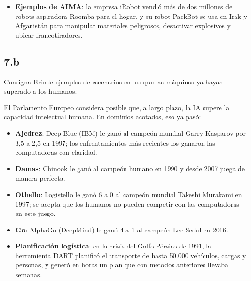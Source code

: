 \documentclass[11pt,a4paper]{article}
\begin{document}
\begin{extras}
\begin{itemize}
  \item \textbf{Ejemplos de AIMA}: la empresa iRobot vendió más de dos millones de robots aspiradora Roomba para el hogar, y su robot PackBot se usa en Irak y Afganistán para manipular materiales peligrosos, desactivar explosivos y ubicar francotiradores.
\end{itemize}
\end{extras}

\subsection{7.b}

\begin{enunciado}{Consigna}
Brinde ejemplos de escenarios en los que las máquinas ya hayan superado a los humanos.
\end{enunciado}

El Parlamento Europeo considera posible que, a largo plazo, la IA supere la capacidad intelectual humana. En dominios acotados, eso ya pasó:
\begin{itemize}
  \item \textbf{Ajedrez}: Deep Blue (IBM) le ganó al campeón mundial Garry Kasparov por 3,5 a 2,5 en 1997; los enfrentamientos más recientes los ganaron las computadoras con claridad.
  \item \textbf{Damas}: Chinook le ganó al campeón humano en 1990 y desde 2007 juega de manera perfecta.
  \item \textbf{Othello}: Logistello le ganó 6 a 0 al campeón mundial Takeshi Murakami en 1997; se acepta que los humanos no pueden competir con las computadoras en este juego.
  \item \textbf{Go}: AlphaGo (DeepMind) le ganó 4 a 1 al campeón Lee Sedol en 2016.
  \item \textbf{Planificación logística}: en la crisis del Golfo Pérsico de 1991, la herramienta DART planificó el transporte de hasta 50.000 vehículos, cargas y personas, y generó en horas un plan que con métodos anteriores llevaba semanas.
\end{itemize}
\end{document}

